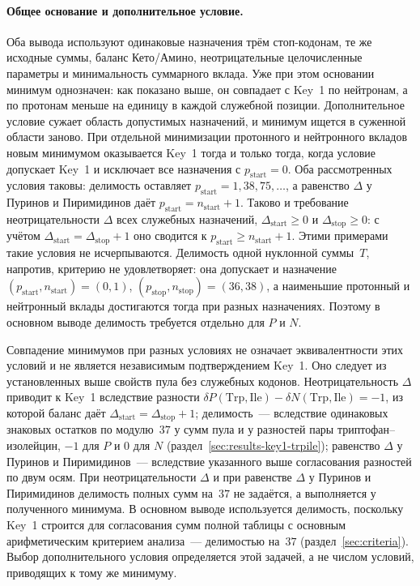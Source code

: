 \documentclass[11pt,a4paper]{article}
\renewcommand{\_}{\origunderscore\allowbreak}
\begin{document}
\paragraph{Общее основание и дополнительное условие.}
Оба вывода используют одинаковые назначения трём стоп-кодонам,
те же исходные суммы, баланс Кето/Амино, неотрицательные
целочисленные параметры и минимальность суммарного вклада.
Уже при этом основании минимум однозначен: как показано выше,
он совпадает с Key~1 по нейтронам, а по протонам меньше на
единицу в каждой служебной позиции. Дополнительное условие
сужает область допустимых назначений, и минимум ищется в
суженной области заново. При отдельной минимизации протонного
и нейтронного вкладов новым минимумом оказывается Key~1 тогда
и только тогда, когда условие допускает Key~1 и исключает все
назначения с $p_{\text{start}}=0$. Оба рассмотренных условия
таковы: делимость оставляет $p_{\text{start}}=1,38,75,\ldots$,
а равенство $\Delta$ у Пуринов и Пиримидинов даёт
$p_{\text{start}}=n_{\text{start}}+1$. Таково и требование
неотрицательности $\Delta$ всех служебных назначений,
$\Delta_{\text{start}}\ge0$ и $\Delta_{\text{stop}}\ge0$:
с учётом $\Delta_{\text{start}}=\Delta_{\text{stop}}+1$ оно
сводится к $p_{\text{start}}\ge n_{\text{start}}+1$. Этими
примерами такие условия не исчерпываются. Делимость одной
нуклонной суммы~$T$, напротив, критерию не удовлетворяет:
она допускает и назначение
$(p_{\text{start}},n_{\text{start}})=(0,1)$,
$(p_{\text{stop}},n_{\text{stop}})=(36,38)$, а наименьшие
протонный и нейтронный вклады достигаются тогда при разных
назначениях. Поэтому в основном выводе делимость требуется
отдельно для $P$ и $N$.

Совпадение минимумов при разных условиях не означает
эквивалентности этих условий и не является независимым
подтверждением Key~1. Оно следует из установленных выше
свойств пула без служебных кодонов. Неотрицательность $\Delta$
приводит к Key~1 вследствие разности
$\delta P(\mathrm{Trp},\mathrm{Ile})-
\delta N(\mathrm{Trp},\mathrm{Ile})=-1$, из которой баланс
даёт $\Delta_{\text{start}}=\Delta_{\text{stop}}+1$;
делимость~--- вследствие одинаковых знаковых остатков
по модулю~$37$ у сумм пула и у разностей пары
триптофан--изолейцин, $-1$ для $P$ и $0$ для $N$
(раздел~\ref{sec:results-key1-trpile});
равенство $\Delta$ у Пуринов и Пиримидинов~--- вследствие
указанного выше согласования разностей по двум осям.
При неотрицательности $\Delta$ и при равенстве $\Delta$
у Пуринов и Пиримидинов делимость полных сумм на~$37$
не задаётся, а выполняется у полученного минимума.
В основном выводе используется делимость, поскольку Key~1
строится для согласования сумм полной таблицы с основным
арифметическим критерием анализа~--- делимостью на~$37$
(раздел~\ref{sec:criteria}). Выбор дополнительного условия
определяется этой задачей, а не числом условий, приводящих
к тому же минимуму.
\end{document}
